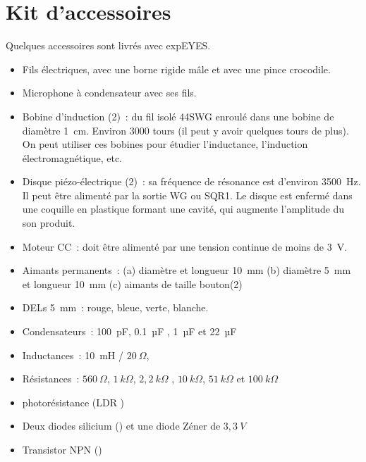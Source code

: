 \documentclass[a4paper,12pt,french]{sphinxmanual}
\begin{document}
\section{Kit d’accessoires}
\label{\detokenize{1.2:kit-d-accessoires}}
Quelques accessoires sont livrés avec expEYES.
\begin{itemize}
\item {} 
Fils électriques, avec une borne rigide mâle et avec une pince crocodile.

\item {} 
Microphone à condensateur avec ses fils.

\item {} 
Bobine d’induction (2) : du fil isolé 44SWG enroulé dans une bobine
de diamètre 1 cm. Environ 3000 tours (il peut y avoir quelques tours
de plus). On peut utiliser ces bobines pour étudier l’inductance,
l’induction électromagnétique, etc.

\item {} 
Disque piézo-électrique (2) : sa fréquence de résonance est d’environ
3500 Hz. Il peut être alimenté par la sortie WG ou SQR1. Le disque
est enfermé dans une coquille en plastique formant une cavité, qui
augmente l’amplitude du son produit.

\item {} 
Moteur CC : doit être alimenté par une tension continue de moins
de 3 V.

\item {} 
Aimants permanents : (a) diamètre et longueur 10 mm (b) diamètre
5 mm et longueur 10 mm (c) aimants de taille bouton(2)

\item {} 
DELs 5 mm : rouge, bleue, verte, blanche.

\item {} 
Condensateurs : 100 pF, 0.1 µF , 1 µF et 22 µF

\item {} 
Inductances : 10 mH / \(20~\Omega\),

\item {} 
Résistances :
\(560~\Omega\), \(1~k\Omega\), \(2,2~k\Omega\) ,
\(10~k\Omega\),
\(51~k\Omega\) et \(100~k\Omega\)

\item {} 
photorésistance (LDR )

\item {} 
Deux diodes silicium () et une diode Zéner de \(3,3~V\)

\item {} 
Transistor NPN ()

\end{itemize}
\end{document}
